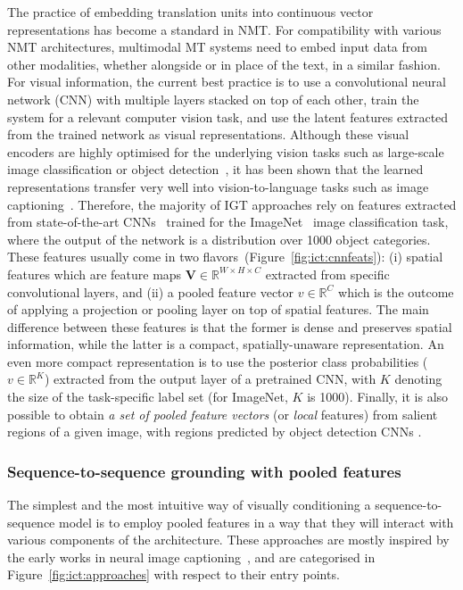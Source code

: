 \documentclass{svjour3}
\def\spatfeats{{\mathbf{V}}}    \def\globfeats{{v}}             \newcommand{\R}{\mathbb{R}}     \newcommand{\argmax}{\mathop{\mathrm{argmax}}\limits}
\begin{document}
The practice of embedding translation units into continuous vector representations has become a standard in NMT. For compatibility with various NMT architectures, multimodal MT systems need to embed input data from other modalities, whether alongside or in place of the text, in a similar fashion. For visual information, the current best practice is to use a convolutional neural network (CNN) with multiple layers stacked on top of each other, train the system for a relevant computer vision task, and use the latent features extracted from the trained network as visual representations. Although these visual encoders are highly optimised for the underlying vision tasks such as large-scale image classification or object detection~\citep{russakovsky-ilsvrc-2015}, it has been shown that the learned representations transfer very well into vision-to-language tasks such as image captioning~\citep{vinyals-show-2015, xu-show-2015}. Therefore,
the majority of IGT approaches rely on features extracted from state-of-the-art CNNs~\citep{simonyan-vgg-2014,ioffe-batch-2015,he-resnet-2016} trained for the ImageNet~\citep{deng-imagenet-2009} image classification task, where the output of the network is a distribution over 1000 object categories. These features usually come in two flavors~(Figure~\ref{fig:ict:cnnfeats}):
(i) spatial features which are feature maps $\spatfeats \in \R^{W\times H\times C}$ extracted from specific convolutional layers, and (ii) a pooled feature vector $\globfeats \in \R^{C}$ which is the outcome of applying a projection or pooling layer on top of spatial features. The main difference between these features is that the former is dense and preserves spatial information, while the latter is a compact, spatially-unaware representation. An even more compact representation is to use the posterior class probabilities ($\globfeats \in \R^{K}$) extracted from the output layer of a pretrained CNN, with $K$ denoting the size of the task-specific label set (for ImageNet, $K$ is 1000).
Finally, it is also possible to obtain \emph{a set of pooled feature vectors} (or \textit{local} features) from salient regions of a given image, with regions predicted by object detection CNNs \citep{girshick-rcnn-2014}.

\subsubsection{Sequence-to-sequence grounding with pooled features}
\label{sec:tasks:ict:cond}
The simplest and the most intuitive way of visually conditioning a sequence-to-sequence model is to employ pooled features in a way that they will interact with various components of the architecture.
These approaches are mostly inspired by the early works in neural image captioning~\citep{kiros-multimodal-2014,mao-deep-2014,vinyals-show-2015}, and are categorised in Figure~\ref{fig:ict:approaches} with respect to their entry points.
\end{document}
